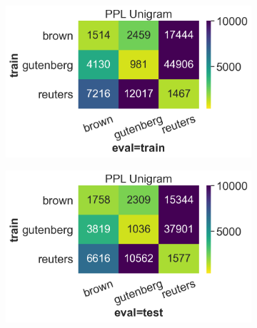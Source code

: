 \documentclass[11pt]{article}
\begin{document}
\FloatBarrier

\begin{figure}
\centering
\begin{subfigure}{0.45\textwidth}
  \includegraphics[width=\textwidth]{figures/unigram_cross_ppl_train.png}
\end{subfigure}
\hspace{5pt}
\begin{subfigure}{0.45\textwidth}
  \includegraphics[width=\textwidth]{figures/unigram_cross_ppl_test.png}
\end{subfigure}

\vspace{1em}


\end{figure}
\end{document}
